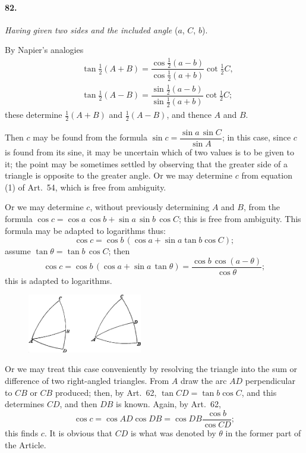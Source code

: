 \documentclass{book}[2004/02/16]
\begin{document}
\begin{mainmatter}
\begin{spacing}{1.3}
\paragraph{82.} \textit{Having given two sides and the included angle} ($a$, $C$, $b$).

By Napier's analogies
\begin{align*}
&\tan \tfrac{1}{2}(A + B) = \dfrac{\cos\tfrac{1}{2}(a - b)}{\cos\tfrac{1}{2}(a + b)}\cot\tfrac{1}{2}C,\\[1ex]
&\tan \tfrac{1}{2}(A - B) = \dfrac{\sin\tfrac{1}{2}(a - b)}{\sin\tfrac{1}{2}(a + b)}\cot\tfrac{1}{2}C;
\end{align*}
these determine $\tfrac{1}{2}(A + B)$ and $\tfrac{1}{2}(A - B)$, and thence $A$ and $B$.

Then $c$ may be found from the formula $\sin c = \dfrac{\sin a\, \sin C}{\sin A}$; in
this case, since $c$ is found from its sine, it may be uncertain which
of two values is to be given to it; the point may be sometimes
settled by observing that the greater side of a triangle is opposite
to the greater angle. Or we may determine $c$ from equation (1) of
Art.~54, which is free from ambiguity.

Or we may determine $c$, without previously determining $A$ and
$B$, from the formula $\cos c = \cos a\, \cos b + \sin a\, \sin b\, \cos C$; this is
free from ambiguity. This formula may be adapted to logarithms
thus:
\[
\cos c = \cos b\, (\cos a + \sin a \tan b \cos C);
\]
assume $\tan \theta = \tan b\, \cos C$; then
\[
\cos c = \cos b\, (\cos a + \sin a\, \tan \theta) = \dfrac{\cos b\, \cos (a - \theta)}{\cos \theta};
\]
this is adapted to logarithms.
\begin{figure}[htp]
\centering
\includegraphics[width=5.0cm]{images/058fc}
\end{figure}

Or we may treat this case conveniently by resolving the triangle
into the sum or difference of two right-angled triangles.
From $A$ draw the arc $AD$ perpendicular to $CB$ or $CB$ produced;
then, by Art.\ 62, $\tan CD = \tan b \cos C$, and this determines $CD$,
and then $DB$ is known. Again, by Art.\ 62,
\[
\cos c = \cos AD \cos DB = \cos DB \dfrac{\cos b}{\cos CD};
\]
this finds $c$. It is obvious that $CD$ is what was denoted by $\theta$ in
the former part of the Article.


\end{spacing}
\end{mainmatter}
\end{document}
